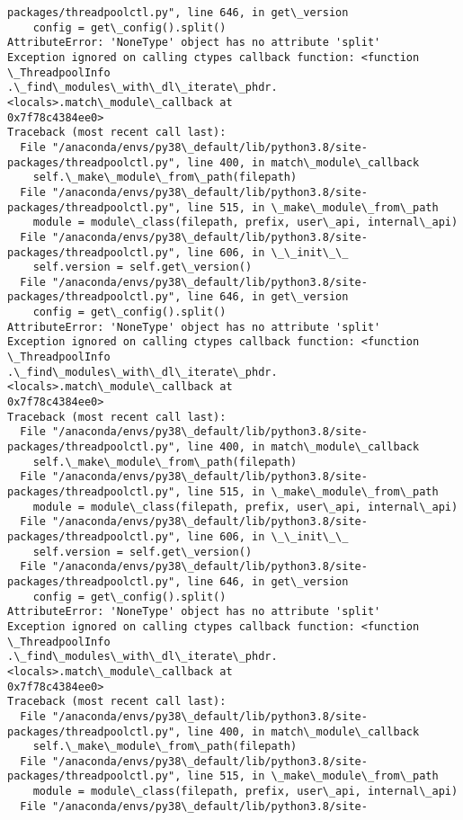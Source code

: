 \documentclass[11pt]{article}
\begin{document}
\begin{Verbatim}[commandchars=\\\{\}]
packages/threadpoolctl.py", line 646, in get\_version
    config = get\_config().split()
AttributeError: 'NoneType' object has no attribute 'split'
Exception ignored on calling ctypes callback function: <function \_ThreadpoolInfo
.\_find\_modules\_with\_dl\_iterate\_phdr.<locals>.match\_module\_callback at
0x7f78c4384ee0>
Traceback (most recent call last):
  File "/anaconda/envs/py38\_default/lib/python3.8/site-
packages/threadpoolctl.py", line 400, in match\_module\_callback
    self.\_make\_module\_from\_path(filepath)
  File "/anaconda/envs/py38\_default/lib/python3.8/site-
packages/threadpoolctl.py", line 515, in \_make\_module\_from\_path
    module = module\_class(filepath, prefix, user\_api, internal\_api)
  File "/anaconda/envs/py38\_default/lib/python3.8/site-
packages/threadpoolctl.py", line 606, in \_\_init\_\_
    self.version = self.get\_version()
  File "/anaconda/envs/py38\_default/lib/python3.8/site-
packages/threadpoolctl.py", line 646, in get\_version
    config = get\_config().split()
AttributeError: 'NoneType' object has no attribute 'split'
Exception ignored on calling ctypes callback function: <function \_ThreadpoolInfo
.\_find\_modules\_with\_dl\_iterate\_phdr.<locals>.match\_module\_callback at
0x7f78c4384ee0>
Traceback (most recent call last):
  File "/anaconda/envs/py38\_default/lib/python3.8/site-
packages/threadpoolctl.py", line 400, in match\_module\_callback
    self.\_make\_module\_from\_path(filepath)
  File "/anaconda/envs/py38\_default/lib/python3.8/site-
packages/threadpoolctl.py", line 515, in \_make\_module\_from\_path
    module = module\_class(filepath, prefix, user\_api, internal\_api)
  File "/anaconda/envs/py38\_default/lib/python3.8/site-
packages/threadpoolctl.py", line 606, in \_\_init\_\_
    self.version = self.get\_version()
  File "/anaconda/envs/py38\_default/lib/python3.8/site-
packages/threadpoolctl.py", line 646, in get\_version
    config = get\_config().split()
AttributeError: 'NoneType' object has no attribute 'split'
Exception ignored on calling ctypes callback function: <function \_ThreadpoolInfo
.\_find\_modules\_with\_dl\_iterate\_phdr.<locals>.match\_module\_callback at
0x7f78c4384ee0>
Traceback (most recent call last):
  File "/anaconda/envs/py38\_default/lib/python3.8/site-
packages/threadpoolctl.py", line 400, in match\_module\_callback
    self.\_make\_module\_from\_path(filepath)
  File "/anaconda/envs/py38\_default/lib/python3.8/site-
packages/threadpoolctl.py", line 515, in \_make\_module\_from\_path
    module = module\_class(filepath, prefix, user\_api, internal\_api)
  File "/anaconda/envs/py38\_default/lib/python3.8/site-

\end{Verbatim}
\end{document}
